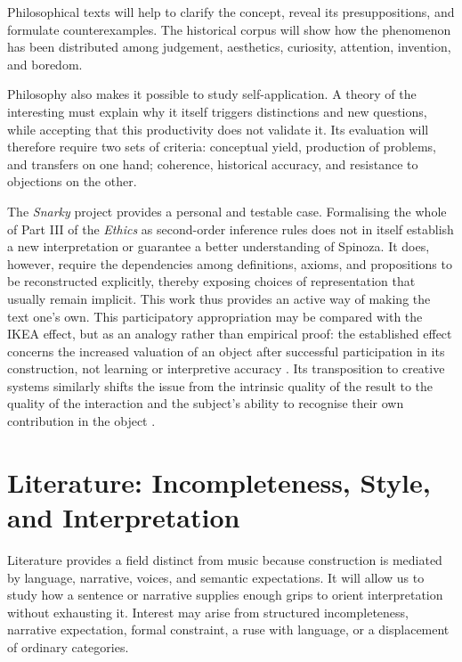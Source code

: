\documentclass[11pt,a4paper]{article}
\begin{document}
Philosophical texts will help to clarify the concept, reveal its presuppositions,
and formulate counterexamples.
The historical corpus will show how the phenomenon has been distributed among
judgement, aesthetics, curiosity, attention, invention, and boredom.

Philosophy also makes it possible to study self-application. A theory of the interesting
must explain why it itself triggers distinctions and new questions, while accepting
that this productivity does not validate it. Its evaluation will therefore
require two sets of criteria: conceptual yield, production of problems, and
transfers on one hand; coherence, historical accuracy, and resistance to
objections on the other.

The \emph{Snarky} project provides a personal and testable case. Formalising the
whole of Part III of the \emph{Ethics} as second-order inference rules does not
in itself establish a new interpretation or guarantee a better understanding of
Spinoza. It does, however, require the dependencies among definitions, axioms,
and propositions to be reconstructed explicitly, thereby exposing choices of
representation that usually remain implicit. This work thus provides an active
way of making the text one's own. This participatory appropriation may be
compared with the IKEA effect, but as an analogy rather than empirical proof:
the established effect concerns the increased valuation of an object after
successful participation in its construction, not learning or interpretive
accuracy \parencite{norton2012ikea}. Its transposition to creative systems
similarly shifts the issue from the intrinsic quality of the result to the
quality of the interaction and the subject's ability to recognise their own
contribution in the object \parencite[152--153]{pachet2026generation}.

\section{Literature: Incompleteness, Style, and Interpretation}

Literature provides a field distinct from music because construction is
mediated by language, narrative, voices, and semantic expectations. It will
allow us to study how a sentence or narrative supplies enough grips to orient
interpretation without exhausting it. Interest may arise from structured
incompleteness, narrative expectation, formal constraint, a ruse with language,
or a displacement of ordinary categories.
\end{document}
